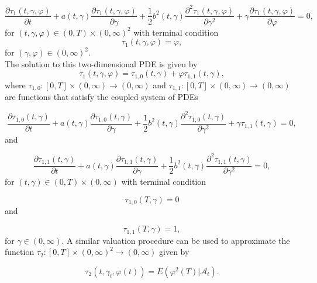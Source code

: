 \documentclass[a4 paper, 12pt]{report}
\theoremstyle{plain}
\begin{document}
\begin{equation}\label{6.17}
\frac{\partial\tau_1(t,\gamma,\varphi)}{\partial t}+a(t,\gamma) \frac{\partial\tau_1(t,\gamma,\varphi)}{\partial \gamma}+\frac{1}{2}b^2(t,\gamma) \frac{\partial^2\tau_1(t,\gamma,\varphi)}{\partial \gamma^2}+\gamma \frac{\partial\tau_1(t,\gamma,\varphi)}{\partial \varphi} = 0, %
\end{equation}
for $(t,\gamma,\varphi)\in(0,T)\times(0,\infty)^2$ with terminal condition
\begin{equation}\label{6.18}
\tau_1(t,\gamma,\varphi) = \varphi,
\end{equation}
for $(\gamma,\varphi)\in(0,\infty)^2$.\\
The solution to this two-dimensional PDE is given by
$$
\tau_1(t,\gamma,\varphi) = \tau_{1,0}(t,\gamma)+\varphi\tau_{1,1}(t,\gamma),
$$
where $\tau_{1,0}:[0,T]\times (0,\infty)\rightarrow (0,\infty)$ and $\tau_{1,1}:[0,T]\times (0,\infty)\rightarrow (0,\infty)$ are functions that satisfy the coupled system of PDEs

\begin{equation}\label{6.19}
\frac{\partial \tau_{1,0}(t,\gamma)}{\partial t}+a(t,\gamma) \frac{\partial \tau_{1,0}(t,\gamma)}{\partial \gamma}+\frac{1}{2}b^2(t,\gamma) \frac{\partial^2\tau_{1,0}(t,\gamma)}{\partial \gamma^2}+\gamma\tau_{1,1}(t,\gamma) = 0,%
\end{equation}
and 

\begin{equation}\label{4.2.20}
\frac{\partial \tau_{1,1}(t,\gamma)}{\partial t}+a(t,\gamma) \frac{\partial \tau_{1,1}(t,\gamma)}{\partial \gamma}+\frac{1}{2}b^2(t,\gamma) \frac{\partial^2\tau_{1,1}(t,\gamma)}{\partial \gamma^2} = 0,%
\end{equation}
for $(t,\gamma)\in(0,T)\times (0,\infty)$ with terminal condition

\begin{equation}\label{4.2.21}
\tau_{1,0}(T,\gamma) = 0
\end{equation}
and

\begin{equation}\label{4.2.22}
\tau_{1,1}(T,\gamma) = 1,
\end{equation}
for $\gamma\in(0,\infty)$. A similar valuation procedure can be used to approximate the function $\tau_2:[0,T]\times (0,\infty)^2\rightarrow(0,\infty)$ given by

\begin{equation}\label{6.23}
\tau_2(t,\gamma_t,\varphi(t)) = E(\varphi^2(T)|\mathcal{A}_t).
\end{equation}
\end{document}
